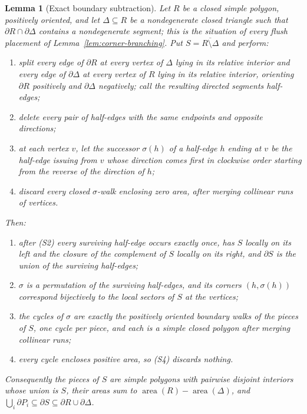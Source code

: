 \documentclass[11pt]{amsart}
\newtheorem{lemma}[theorem]{Lemma}
\theoremstyle{definition}
\theoremstyle{remark}
\begin{document}
\begin{lemma}[Exact boundary subtraction]\label{lem:exact-subtraction}
Let $R$ be a closed simple polygon, positively oriented, and let
$\Delta\subseteq R$ be a nondegenerate closed triangle such that
$\partial R\cap\partial\Delta$ contains a nondegenerate segment; this is the
situation of every flush placement of Lemma~\ref{lem:corner-branching}.  Put
$S=\overline{R\setminus\Delta}$ and perform:
\begin{enumerate}[label=\textup{(S\arabic*)},leftmargin=3.1em]
\item split every edge of $\partial R$ at every vertex of $\Delta$ lying in
      its relative interior and every edge of $\partial\Delta$ at every
      vertex of $R$ lying in its relative interior, orienting $\partial R$
      positively and $\partial\Delta$ negatively; call the resulting directed
      segments \emph{half-edges};
\item delete every pair of half-edges with the same endpoints and opposite
      directions;
\item at each vertex $v$, let the successor $\sigma(h)$ of a half-edge $h$
      ending at $v$ be the half-edge issuing from $v$ whose direction comes
      first in clockwise order starting from the reverse of the direction of
      $h$;
\item discard every closed $\sigma$-walk enclosing zero area, after merging
      collinear runs of vertices.
\end{enumerate}
Then:
\begin{enumerate}[label=\textup{(\alph*)}]
\item after \textup{(S2)} every surviving half-edge occurs exactly once, has
      $S$ locally on its left and the closure of the complement of $S$
      locally on its right, and $\partial S$ is the union of the surviving
      half-edges;
\item $\sigma$ is a permutation of the surviving half-edges, and its corners
      $(h,\sigma(h))$ correspond bijectively to the local sectors of $S$ at
      the vertices;
\item the cycles of $\sigma$ are exactly the positively oriented boundary
      walks of the pieces of $S$, one cycle per piece, and each is a simple
      closed polygon after merging collinear runs;
\item every cycle encloses positive area, so \textup{(S4)} discards nothing.
\end{enumerate}
Consequently the pieces of $S$ are simple polygons with pairwise disjoint
interiors whose union is $S$, their areas sum to
$\operatorname{area}(R)-\operatorname{area}(\Delta)$, and
$\bigcup_i\partial P_i\subseteq\partial S\subseteq
\partial R\cup\partial\Delta$.
\end{lemma}
\end{document}
